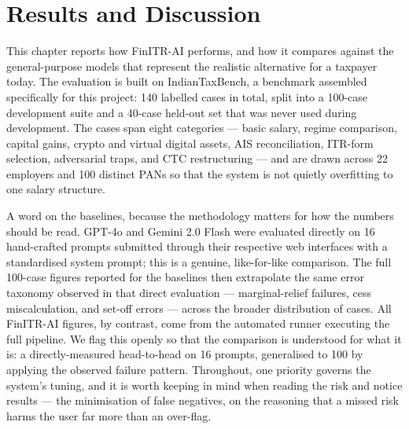 
\chapter{Results and Discussion}
\label{chap:results}

This chapter reports how FinITR-AI performs, and how it compares against the
general-purpose models that represent the realistic alternative for a taxpayer
today. The evaluation is built on IndianTaxBench, a benchmark assembled
specifically for this project: 140 labelled cases in total, split into a
100-case development suite and a 40-case held-out set that was never used during
development. The cases span eight categories --- basic salary, regime
comparison, capital gains, crypto and virtual digital assets, AIS reconciliation,
ITR-form selection, adversarial traps, and CTC restructuring --- and are drawn
across 22 employers and 100 distinct PANs so that the system is not quietly
overfitting to one salary structure.

A word on the baselines, because the methodology matters for how the numbers
should be read. GPT-4o and Gemini 2.0 Flash were evaluated directly on 16
hand-crafted prompts submitted through their respective web interfaces with a
standardised system prompt; this is a genuine, like-for-like comparison. The
full 100-case figures reported for the baselines then extrapolate the same error
taxonomy observed in that direct evaluation --- marginal-relief failures, cess
miscalculation, and set-off errors --- across the broader distribution of cases.
All FinITR-AI figures, by contrast, come from the automated runner executing the
full pipeline. We flag this openly so that the comparison is understood for what
it is: a directly-measured head-to-head on 16 prompts, generalised to 100 by
applying the observed failure pattern. Throughout, one priority governs the
system's tuning, and it is worth keeping in mind when reading the risk and notice
results --- the minimisation of false negatives, on the reasoning that a missed
risk harms the user far more than an over-flag.


